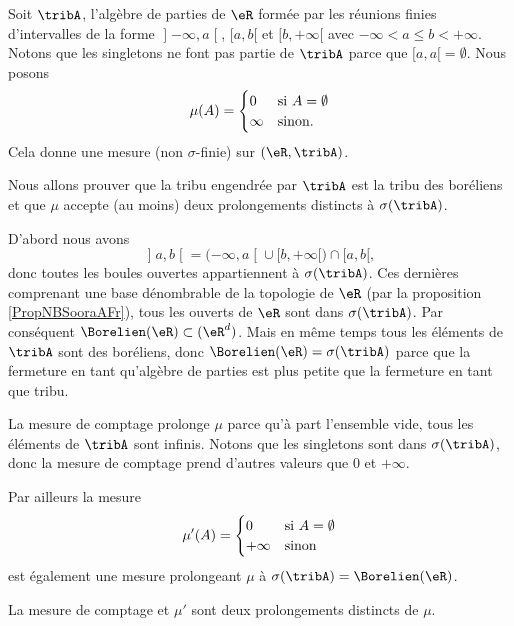 \begin{example} \label{ExKCEoolsZrL}
Soit \( \tribA\), l'algèbre de parties de \( \eR\) formée par les réunions finies d'intervalles de la forme \( \mathopen] -\infty , a \mathclose[\), \( \mathopen[ a , b [\) et \( \mathopen[ b , +\infty [\) avec \( -\infty<a\leq b<+\infty\). Notons que les singletons ne font pas partie de \( \tribA\) parce que \( \mathopen[ a ,a[=\emptyset\). Nous posons
    \begin{equation}
        \mu(A)=\begin{cases}
            0    &   \text{si \( A=\emptyset\)}\\
            \infty    &    \text{sinon}.
        \end{cases}
    \end{equation}
    Cela donne une mesure (non \( \sigma\)-finie) sur \( (\eR,\tribA)\).

    Nous allons prouver que la tribu engendrée par \( \tribA\) est la tribu des boréliens et que \( \mu\) accepte (au moins) deux prolongements distincts à \( \sigma(\tribA)\).

    D'abord nous avons
    \begin{equation}
        \mathopen] a , b \mathclose[=\big( \mathopen -\infty , a \mathclose[\cup \mathopen[ b , +\infty [ \big)\cap\mathopen[ a , b [,
    \end{equation}
    donc toutes les boules ouvertes appartiennent à \( \sigma(\tribA)\). Ces dernières comprenant une base dénombrable de la topologie de \( \eR\) (par la proposition \ref{PropNBSooraAFr}), tous les ouverts de \( \eR\) sont dans \( \sigma(\tribA)\). Par conséquent \( \Borelien(\eR)\subset(\eR^d)\). Mais en même temps tous les éléments de \( \tribA\) sont des boréliens, donc \( \Borelien(\eR)=\sigma(\tribA)\) parce que la fermeture en tant qu'algèbre de parties est plus petite que la fermeture en tant que tribu.

    La mesure de comptage prolonge \( \mu\) parce qu'à part l'ensemble vide, tous les éléments de \( \tribA\) sont infinis. Notons que les singletons sont dans \( \sigma(\tribA)\), donc la mesure de comptage prend d'autres valeurs que \( 0\) et \( +\infty\).

    Par ailleurs la mesure
    \begin{equation}
        \mu'(A)=\begin{cases}
            0    &   \text{si \( A=\emptyset\)}\\
            +\infty    &    \text{sinon}
        \end{cases}
    \end{equation}
    est également une mesure prolongeant \( \mu\) à \( \sigma(\tribA)=\Borelien(\eR)\).

    La mesure de comptage et \( \mu'\) sont deux prolongements distincts de \( \mu\).
\end{example}

